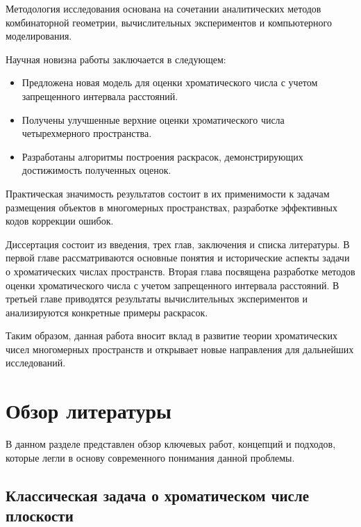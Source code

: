 \documentclass[12pt]{article}
\begin{document}
Методология исследования основана на сочетании аналитических методов комбинаторной геометрии, вычислительных экспериментов и компьютерного моделирования. 

Научная новизна работы заключается в следующем:
\begin{itemize}
    \item Предложена новая модель для оценки хроматического числа с учетом запрещенного интервала расстояний.
    \item Получены улучшенные верхние оценки хроматического числа четырехмерного пространства.
    \item Разработаны алгоритмы построения раскрасок, демонстрирующих достижимость полученных оценок.
\end{itemize}

Практическая значимость результатов состоит в их применимости к задачам размещения объектов в многомерных пространствах, разработке эффективных кодов коррекции ошибок.

Диссертация состоит из введения, трех глав, заключения и списка литературы. В первой главе рассматриваются основные понятия и исторические аспекты задачи о хроматических числах пространств. Вторая глава посвящена разработке методов оценки хроматического числа с учетом запрещенного интервала расстояний. В третьей главе приводятся результаты вычислительных экспериментов и анализируются конкретные примеры раскрасок.

Таким образом, данная работа вносит вклад в развитие теории хроматических чисел многомерных пространств и открывает новые направления для дальнейших исследований.



\maketitle

\section{Обзор литературы}
 В данном разделе представлен обзор ключевых работ, концепций и подходов, которые легли в основу современного понимания данной проблемы.

\subsection{Классическая задача о хроматическом числе плоскости}
\end{document}
